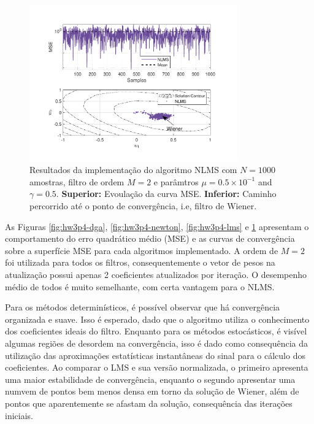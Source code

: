 \begin{figure}[!htp]
    \centering
    \includegraphics[width=0.80\textwidth]{fig/hw3p4-nlms.pdf}
    \caption{Resultados da implementação do algoritmo NLMS com $N = 1000$ amostras, filtro de ordem $M = 2$ e parâmtros $\mu = 0.5 \times 10^{-1}$ and $\gamma = 0.5 $. \textbf{Superior:} Evoulação da curva MSE. \textbf{Inferior:} Caminho percorrido até o ponto de convergência, i.e, filtro de Wiener.}
    \label{fig:hw3p4-nlms}
\end{figure}


As Figuras \ref{fig:hw3p4-dga}, \ref{fig:hw3p4-newton}, \ref{fig:hw3p4-lms} e \ref{fig:hw3p4-nlms} apresentam
o comportamento do erro quadrático médio (MSE) e as curvas de convergência sobre a superfície MSE para cada  algoritmos implementado. A ordem de $M = 2$ foi utilizada para todos os filtros, consequentemente o vetor de pesos na atualização possui apenas 2 coeficientes atualizados por iteração. O desempenho médio de todos é muito semelhante, com certa vantagem para o NLMS.

Para os métodos determinísticos, é possível observar que há convergência organizada e suave. Isso é esperado, dado que o algoritmo utiliza o conhecimento dos coeficientes ideais do filtro. Enquanto para os métodos estocásticos, é visível algumas regiões de desordem na convergência, isso é dado como consequência da utilização das aproximações estatísticas instantâneas do sinal para o cálculo dos coeficientes. Ao comparar o LMS e sua versão normalizada, o primeiro apresenta uma maior estabilidade de convergência, enquanto o segundo apresentar uma numvem de pontos bem menos densa em torno da solução de Wiener, além de pontos que aparentemente se afastam da solução, consequência das iterações iniciais.

\clearpage 


